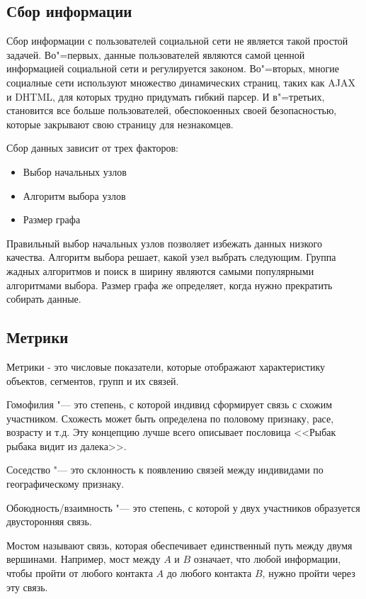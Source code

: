 \subsection{Сбор информации}
Сбор информации с пользователей социальной сети не является такой простой задачей. Во"=первых, данные пользователей являются самой ценной информацией социальной сети и регулируется законом. Во"=вторых, многие социалные сети используют множество динамических страниц, таких как AJAX и DHTML, для которых трудно придумать гибкий парсер. И в"=третьих, становится все больше пользователей, обеспокоенных своей безопасностью, которые закрывают свою страницу для незнакомцев. 

Сбор данных зависит от трех факторов:
\begin{itemize}
    \item Выбор начальных узлов
    \item Алгоритм выбора узлов
    \item Размер графа
\end{itemize}
Правильный выбор начальных узлов позволяет избежать данных низкого качества. Алгоритм выбора решает, какой узел выбрать следующим. Группа жадных алгоритмов и поиск в ширину являются самыми популярными алгоритмами выбора. Размер графа же определяет, когда нужно прекратить собирать данные.
\cite{CrawlingONS}

\subsection{Метрики}
Метрики - это числовые показатели, которые отображают характеристику объектов, сегментов, групп и их связей. 

Гомофилия "--- это степень, с которой индивид сформирует связь с схожим участником. Схожесть может быть определена по половому признаку, расе, возрасту и т.д. Эту концепцию лучше всего описывает пословица <<Рыбак рыбака видит из далека>>.

Соседство "--- это склонность к появлению связей между индивидами по географическому признаку.

Обоюдность/взаимность "--- это степень, с которой у двух участников образуется двусторонняя связь.
\cite{kadushin2012understanding}

Мостом называют связь, которая обеспечивает единственный путь между двумя вершинами. Например, мост между $A$ и $B$ означает, что любой информации, чтобы пройти от любого контакта $A$ до любого контакта $B$, нужно пройти через эту связь.\cite{Granovetter}

